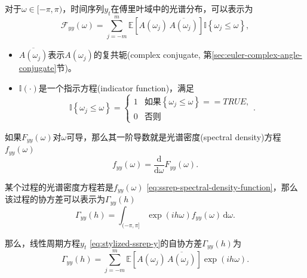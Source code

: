 对于$\omega \in [ - \pi, \pi )$，时间序列$y_{t}$在傅里叶域中的光谱分布，可以表示为
\begin{equation}
  \label{sec:stylized-ssrep-fourier-y}
  \mathcal{F}_{yy} \left( \omega \right) = \sum_{j=-m}^{m}
  \mathbb{E} \left[ A \left( \omega_{j} \right) \,
  \overline{
  A \left( \omega_{j} \right)
  }
  \right]
  \mathbb{I} \left\{ \omega_{j} \le \omega \right\},
\end{equation}
\begin{itemize}
  \item $\overline{A \left( \omega_{j} \right)}$表示$A \left( \omega_{j} \right)$的复共轭(complex conjugate, 第\ref{sec:euler-complex-angle-conjugate}节)。
  \item $ \mathbb{I}(\cdot)$是一个指示方程(indicator function)，满足
  \begin{equation}
    \label{eq:euler-complex-indicator-function-def}
    \mathbb{I} \left\{ \omega_{j} \le \omega \right\}
    = \begin{cases}
    1 & \text{如果}\left\{\omega_{j} \le \omega \right\} == TRUE, \\
    0 & \text{否则}
    \end{cases}.
  \end{equation}
\end{itemize}

如果$F_{yy} \left( \omega \right)$对$\omega$可导，那么其一阶导数就是光谱密度(spectral density)方程$f_{yy} \left( \omega \right)$
\begin{equation}
  \label{eq:ssrep-spectral-density-function}
  f_{yy} \left( \omega \right) = \frac{\mathrm{d}}{\mathrm{d} \omega} F_{yy} \left( \omega \right).
\end{equation}

某个过程的光谱密度方程若是$f_{yy} \left( \omega \right)$ \eqref{eq:ssrep-spectral-density-function}，那么该过程的协方差可以表示为$\Gamma_{yy} \left( h \right)$
\begin{equation}
  \label{eq:ssrep-spectral-covariance}
  \Gamma_{yy} \left( h \right) = \int_{(- \pi, \pi ]}
  \exp \left( i h \omega \right)
  f_{yy} \left( \omega \right) \, \mathrm{d} \omega.
\end{equation}

那么，线性周期方程$y_{t}$ \eqref{eq:stylized-ssrep-y}的自协方差$\Gamma_{yy} \left( h \right)$为
\begin{equation}
  \label{eq:stylized-ssrep-y-autocovariance}
  \Gamma_{yy} \left( h \right)
  = \sum_{j=-m}^{m} \mathbb{E} \left[ A \left( \omega_{j} \right) \, \overline{A \left( \omega_{j} \right)} \right] \exp \left( i h \omega \right).
\end{equation}

